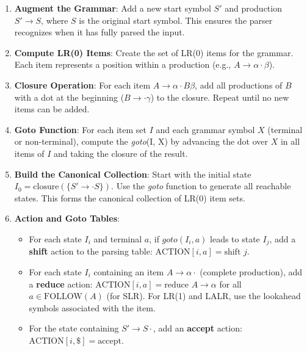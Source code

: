 \begin{enumerate}
  \item \textbf{Augment the Grammar}: Add a new start symbol \(S'\) and production \(S' \to S\), where \(S\) is the original start symbol. This ensures the parser recognizes when it has fully parsed the input.

  \item \textbf{Compute LR(0) Items}: Create the set of LR(0) items for the grammar. Each item represents a position within a production (e.g., \(A \to \alpha \cdot \beta\)).

  \item \textbf{Closure Operation}: For each item \(A \to \alpha \cdot B \beta\), add all productions of \(B\) with a dot at the beginning (\(B \to \cdot \gamma\)) to the closure. Repeat until no new items can be added.

  \item \textbf{Goto Function}: For each item set \(I\) and each grammar symbol \(X\) (terminal or non-terminal), compute the \textit{goto}(I, X) by advancing the dot over \(X\) in all items of \(I\) and taking the closure of the result.

  \item \textbf{Build the Canonical Collection}: Start with the initial state \(I_0 = \text{closure}(\{S' \to \cdot S\})\). Use the \textit{goto} function to generate all reachable states. This forms the canonical collection of LR(0) item sets.

  \item \textbf{Action and Goto Tables}:
  \begin{itemize}
    \item For each state $I_i$ and terminal $a$, if $\textit{goto}(I_i, a)$ leads to state \(I_j\), add a \textbf{shift} action to the parsing table: \(\text{ACTION}[i, a] = \text{shift } j\).
    \item For each state \(I_i\) containing an item \(A \to \alpha \cdot\) (complete production), add a \textbf{reduce} action: \(\text{ACTION}[i, a] = \text{reduce } A \to \alpha\) for all \(a \in \text{FOLLOW}(A)\) (for SLR). For LR(1) and LALR, use the lookahead symbols associated with the item.
    \item For the state containing \(S' \to S \cdot\), add an \textbf{accept} action: \(\text{ACTION}[i, \$] = \text{accept}\).
  \end{itemize}


\end{enumerate}
